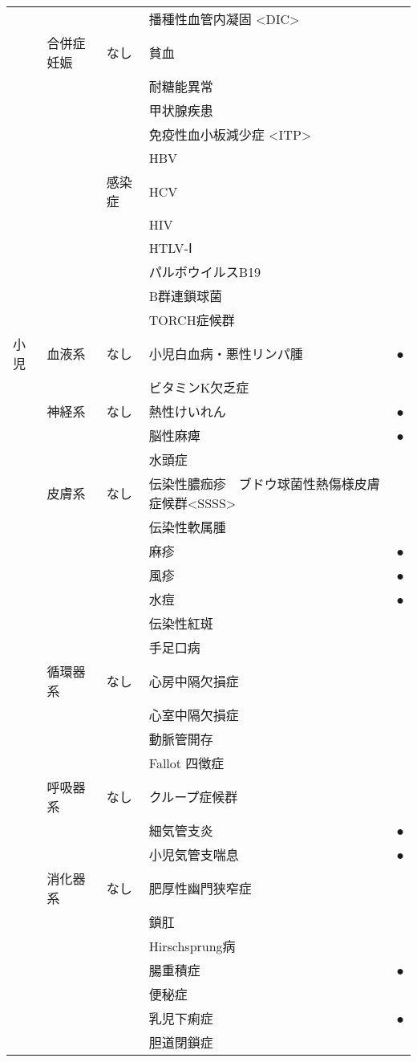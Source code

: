 \begin{xltabular}{\linewidth}{XXXXX}
 &  &  & 播種性血管内凝固 <DIC>  &  \\
 & 合併症妊娠 & なし & 貧血 &  \\
 &  &  & 耐糖能異常 &  \\
 &  &  & 甲状腺疾患 &  \\
 &  &  & 免疫性血小板減少症 <ITP> &  \\
 &  &  & HBV &  \\
 &  & 感染症 & HCV &  \\
 &  &  & HIV &  \\
 &  &  & HTLV-Ⅰ &  \\
 &  &  & パルボウイルスB19 &  \\
 &  &  & B群連鎖球菌 &  \\
 &  &  & TORCH症候群 &  \\
小児 & 血液系 & なし & 小児白血病・悪性リンパ腫 & ● \\
 &  &  & ビタミンK欠乏症 &  \\
 & 神経系 & なし & 熱性けいれん & ● \\
 &  &  & 脳性麻痺 & ● \\
 &  &  & 水頭症 &  \\
 & 皮膚系 & なし & 伝染性膿痂疹　ブドウ球菌性熱傷様皮膚症候群<SSSS> &  \\
 &  &  & 伝染性軟属腫 &  \\
 &  &  & 麻疹 & ● \\
 &  &  & 風疹 & ● \\
 &  &  & 水痘 & ● \\
 &  &  & 伝染性紅斑 &  \\
 &  &  & 手足口病 &  \\
 & 循環器系 & なし & 心房中隔欠損症 &  \\
 &  &  & 心室中隔欠損症 &  \\
 &  &  & 動脈管開存 &  \\
 &  &  & Fallot 四徴症 &  \\
 & 呼吸器系 & なし & クループ症候群 &  \\
 &  &  & 細気管支炎 & ● \\
 &  &  & 小児気管支喘息 & ● \\
 & 消化器系 & なし & 肥厚性幽門狭窄症 &  \\
 &  &  & 鎖肛 &  \\
 &  &  & Hirschsprung病 &  \\
 &  &  & 腸重積症 & ● \\
 &  &  & 便秘症 &  \\
 &  &  & 乳児下痢症 & ● \\
 &  &  & 胆道閉鎖症 &  \\

\end{xltabular}
